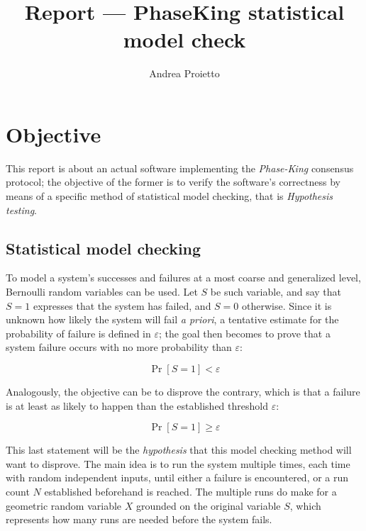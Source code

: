 \documentclass{article}
\title{Report --- PhaseKing statistical model check}
\author{Andrea Proietto}
\begin{document}
    \maketitle


    \section{Objective}

    This report is about an actual software implementing the \emph{Phase-King} consensus protocol; the objective of the former is to verify the software's correctness by means of a specific method of statistical model checking, that is \emph{Hypothesis testing}.

    \subsection{Statistical model checking}

    To model a system's successes and failures at a most coarse and generalized level, Bernoulli random variables can be used. Let $S$ be such variable, and say that $S = 1$ expresses that the system has failed, and $S = 0$ otherwise. Since it is unknown how likely the system will fail \emph{a priori}, a tentative estimate for the probability of failure is defined in $\varepsilon$; the goal then becomes to prove that a system failure occurs with no more probability than $\varepsilon$:

    \[
        \Pr[S = 1] < \varepsilon
    \]

    Analogously, the objective can be to disprove the contrary, which is that a failure is at least as likely to happen than the established threshold $\varepsilon$:

    \[
        \Pr[S = 1] \geq \varepsilon
    \]

    This last statement will be the \emph{hypothesis} that this model checking method will want to disprove. The main idea is to run the system multiple times, each time with random independent inputs, until either a failure is encountered, or a run count $N$ established beforehand is reached. The multiple runs do make for a geometric random variable $X$ grounded on the original variable $S$, which represents how many runs are needed before the system fails.
\end{document}
